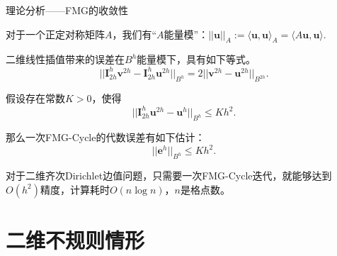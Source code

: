 \documentclass[9pt]{beamer}
\begin{document}
\begin{frame}{理论分析——FMG的收敛性}
  \small

  \begin{definition}
    \small
    对于一个正定对称矩阵$A$，我们有“$A$能量模”：$||\mathbf{u}||_A:=\langle \mathbf{u},\mathbf{u} \rangle_A=\langle A\mathbf{u},\mathbf{u} \rangle$.
  \end{definition}

  \pause
  \begin{lemma}
    \small
    二维线性插值带来的误差在$B^h$能量模下，具有如下等式。
    \begin{equation}
      ||\mathbf{I}_{2h}^h\mathbf{v}^{2h}-\mathbf{I}_{2h}^h\mathbf{u}^{2h}||_{B^h}=2||\mathbf{v}^{2h}-\mathbf{u}^{2h}||_{B^{2h}}.
    \end{equation}
  \end{lemma}

  \pause
  \begin{lemma}
    \small
    假设存在常数$K>0$，使得
    \begin{equation}
      ||\mathbf{I}_{2h}^h \mathbf{u}^{2h}-\mathbf{u}^{h}||_{B^h}\leq Kh^2.
    \end{equation}
  
    那么一次FMG-Cycle的代数误差有如下估计：
    \begin{equation}
      ||\mathbf{e}^h||_{B^h}\leq Kh^2.
    \end{equation}
  \end{lemma}

  \pause
  \begin{theorem}
    \small
    对于二维齐次Dirichlet边值问题，只需要一次FMG-Cycle迭代，就能够达到$O(h^2)$精度，计算耗时$O(n\log n)$，$n$是格点数。
  \end{theorem}
\end{frame}


\section{二维不规则情形}
\end{document}
